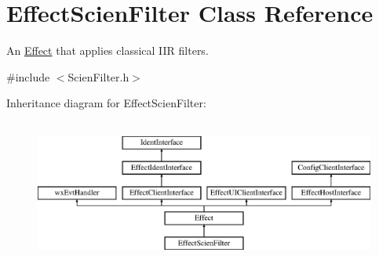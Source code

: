 \hypertarget{class_effect_scien_filter}{}\section{Effect\+Scien\+Filter Class Reference}
\label{class_effect_scien_filter}


An \hyperlink{class_effect}{Effect} that applies \textquotesingle{}classical\textquotesingle{} I\+IR filters.  




{\ttfamily \#include $<$Scien\+Filter.\+h$>$}

Inheritance diagram for Effect\+Scien\+Filter\+:\begin{figure}[H]
\begin{center}
\leavevmode
\includegraphics[height=4.794520cm]{class_effect_scien_filter}
\end{center}
\end{figure}
